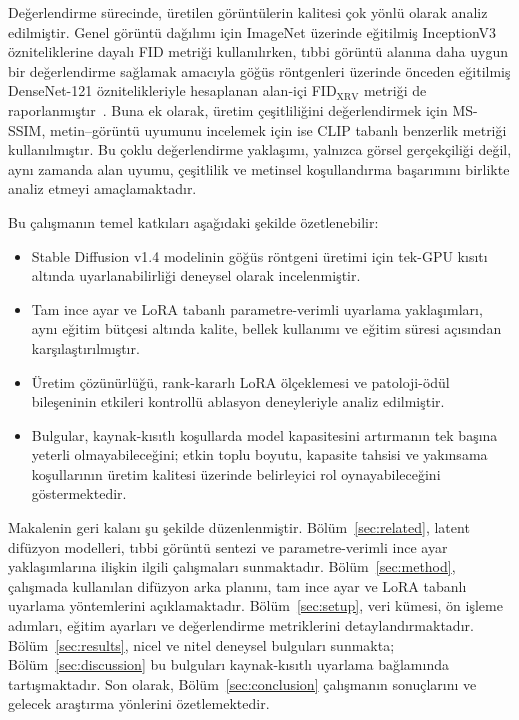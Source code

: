 \documentclass[11pt]{article}
\begin{document}
Değerlendirme sürecinde, üretilen görüntülerin kalitesi çok yönlü olarak analiz
edilmiştir. Genel görüntü dağılımı için ImageNet üzerinde eğitilmiş InceptionV3
özniteliklerine dayalı FID metriği kullanılırken, tıbbi görüntü alanına daha
uygun bir değerlendirme sağlamak amacıyla göğüs röntgenleri üzerinde
önceden eğitilmiş DenseNet-121 öznitelikleriyle hesaplanan alan-içi
FID$_{\text{XRV}}$ metriği de raporlanmıştır~\cite{fid,xrv}. Buna ek olarak,
üretim çeşitliliğini değerlendirmek için MS-SSIM, metin--görüntü uyumunu
incelemek için ise CLIP tabanlı benzerlik metriği kullanılmıştır. Bu çoklu
değerlendirme yaklaşımı, yalnızca görsel gerçekçiliği değil, aynı zamanda alan
uyumu, çeşitlilik ve metinsel koşullandırma başarımını birlikte analiz etmeyi
amaçlamaktadır.

Bu çalışmanın temel katkıları aşağıdaki şekilde özetlenebilir:
\begin{itemize}
\item Stable Diffusion v1.4 modelinin göğüs röntgeni üretimi için tek-GPU
kısıtı altında uyarlanabilirliği deneysel olarak incelenmiştir.
\item Tam ince ayar ve LoRA tabanlı parametre-verimli uyarlama yaklaşımları,
aynı eğitim bütçesi altında kalite, bellek kullanımı ve eğitim süresi açısından
karşılaştırılmıştır.
\item Üretim çözünürlüğü, rank-kararlı LoRA ölçeklemesi ve patoloji-ödül
bileşeninin etkileri kontrollü ablasyon deneyleriyle analiz edilmiştir.
\item Bulgular, kaynak-kısıtlı koşullarda model kapasitesini artırmanın tek
başına yeterli olmayabileceğini; etkin toplu boyutu, kapasite tahsisi ve
yakınsama koşullarının üretim kalitesi üzerinde belirleyici rol oynayabileceğini
göstermektedir.
\end{itemize}

Makalenin geri kalanı şu şekilde düzenlenmiştir. Bölüm~\ref{sec:related},
latent difüzyon modelleri, tıbbi görüntü sentezi ve parametre-verimli ince ayar
yaklaşımlarına ilişkin ilgili çalışmaları sunmaktadır. Bölüm~\ref{sec:method},
çalışmada kullanılan difüzyon arka planını, tam ince ayar ve LoRA tabanlı
uyarlama yöntemlerini açıklamaktadır. Bölüm~\ref{sec:setup}, veri kümesi,
ön işleme adımları, eğitim ayarları ve değerlendirme metriklerini
detaylandırmaktadır. Bölüm~\ref{sec:results}, nicel ve nitel deneysel bulguları
sunmakta; Bölüm~\ref{sec:discussion} bu bulguları kaynak-kısıtlı uyarlama
bağlamında tartışmaktadır. Son olarak, Bölüm~\ref{sec:conclusion} çalışmanın
sonuçlarını ve gelecek araştırma yönlerini özetlemektedir.
\end{document}
